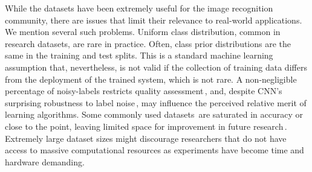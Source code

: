 \documentclass[10pt,twocolumn,letterpaper]{article}
\begin{document}
While the datasets have been extremely useful for the image recognition community, there are issues that limit their relevance to real-world applications. We mention several such problems. Uniform class distribution, common in research datasets, are rare in practice. Often, class prior distributions are the same in the training and test splits. This is a standard machine learning assumption that, nevertheless, is not valid if the collection of training data differs from the deployment of the trained system, which is not rare. A non-negligible percentage of noisy-labels restricts quality assessment\,\cite{done_with_imagenet}, and, despite CNN's surprising robustness to label noise\,\cite{unreas_effec}, may influence the perceived relative merit of learning algorithms. Some commonly used datasets\,\cite{imagenet, dataset-Cars, dataset-flower} are saturated in accuracy or close to the point, leaving limited space for improvement in future research\,\cite{done_with_imagenet}. 
Extremely large dataset sizes might discourage researchers that do not have access to massive computational resources as experiments have become time and hardware demanding. \\
\end{document}
